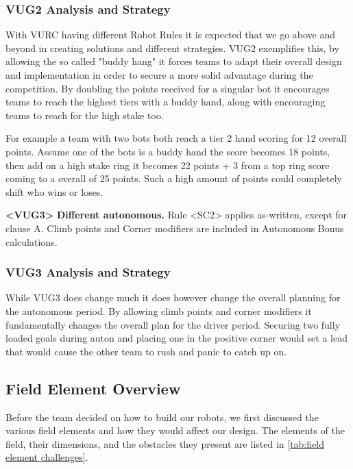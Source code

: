 \subsubsection{VUG2 Analysis and Strategy}
With VURC having different Robot Rules it is expected that we go above and beyond in creating solutions and different strategies. VUG2 exemplifies this, by allowing the so called "buddy hang" it forces teams to adapt their overall design and implementation in order to secure a more solid advantage during the competition. By doubling the points received for a singular bot it encourages teams to reach the highest tiers with a buddy hand, along with encouraging teams to reach for the high stake too.


     For example a team with two bots both reach a tier 2 hand scoring for 12 overall points. Assume one of the bots is a buddy hand the score becomes 18 points, then add on a high stake ring it becomes 22 points + 3 from a top ring score coming to a overall of 25 points. Such a high amount of points could completely shift who wins or loses. 
\newline

\textbf{<VUG3>} \textbf{Different autonomous.} Rule <SC2> applies as-written, except for clause A. Climb points and Corner modifiers are included in Autonomous Bonus calculations. 
\newline

\subsubsection{VUG3 Analysis and Strategy}
While VUG3 does change much it does however change the overall planning for the autonomous period.  By allowing climb points and corner modifiers it fundamentally changes the overall plan for the driver period.  Securing two fully loaded goals during auton and placing one in the positive corner would set a lead that would cause the other team to rush and panic to catch up on. 
\newline

\subsection{Field Element Overview}
Before the team decided on how to build our robots, we first discussed the various field
elements and how they would affect our design. The elements of the field, their dimensions, and the obstacles they present are listed in \ref{tab:field element challenges}.


